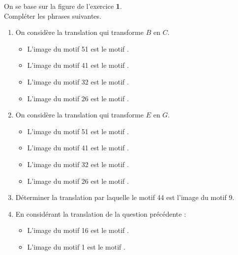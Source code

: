 \begin{exercice*}
    On se base sur la figure de l'exercice {\bfseries 1}.\\ Compléter les phrases suivantes.
    \begin{enumerate}
        \item On considère la translation qui transforme $B$ en $C$.
        \begin{itemize}
            \item L'image du motif \num{51} est le motif \dotfill.
            \item L'image du motif \num{41} est le motif \dotfill.
            \item L'image du motif \num{32} est le motif \dotfill.
            \item L'image du motif \num{26} est le motif \dotfill.
        \end{itemize}
        \item On considère la translation qui transforme $E$ en $G$.
        \begin{itemize}
            \item L'image du motif \num{51} est le motif \dotfill.
            \item L'image du motif \num{41} est le motif \dotfill.
            \item L'image du motif \num{32} est le motif \dotfill.
            \item L'image du motif \num{26} est le motif \dotfill.
        \end{itemize}
        \item Déterminer la translation par laquelle le motif \num{44} est l'image du motif \num{9}.
        \item En considérant la translation de la question précédente :
        \begin{itemize}
            \item L'image du motif \num{16} est le motif \dotfill.
            \item L'image du motif \num{1} est le motif \dotfill.
        \end{itemize}
    \end{enumerate}
\end{exercice*}
